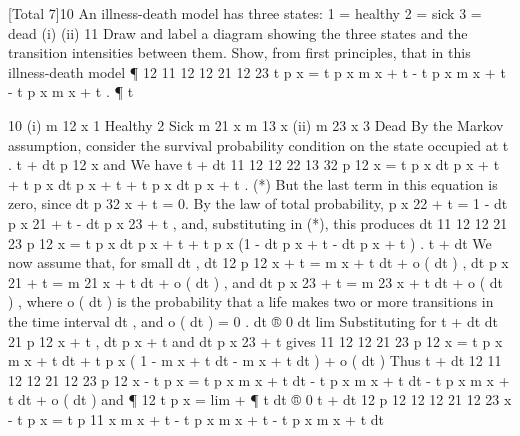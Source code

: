\documentclass[a4paper,12pt]{article}
\begin{document}
[Total 7]10
An illness-death model has three states:
1 = healthy
2 = sick
3 = dead
(i)
(ii)
11
Draw and label a diagram showing the three states and the transition
intensities between them.
Show, from first principles, that in this illness-death model
¶ 12
11 12
12 21
12 23
t p x = t p x m x + t - t p x m x + t - t p x m x + t .
¶ t

10
(i)
m 12
x
1 Healthy
2 Sick
m 21
x
m 13
x
(ii)
m 23
x
3 Dead
By the Markov assumption, consider the survival probability
condition on the state occupied at t .
t + dt
p 12
x and
We have
t + dt
11
12
12
22
13
32
p 12
x = t p x dt p x + t + t p x dt p x + t + t p x dt p x + t . (*)
But the last term in this equation is zero, since
dt
p 32
x + t = 0.
By the law of total probability,
p x 22 + t = 1 - dt p x 21 + t - dt p x 23 + t ,
and, substituting in (*), this produces
dt
11
12
12
21
23
p 12
x = t p x dt p x + t + t p x (1 - dt p x + t - dt p x + t ) .
t + dt
We now assume that, for small dt ,
dt 12
p 12
x + t = m x + t dt + o ( dt ) ,
dt p x 21 + t = m 21
x + t dt + o ( dt ) , and
dt p x 23 + t = m 23
x + t dt + o ( dt ) ,
where o ( dt ) is the probability that a life makes two or more transitions
in the time interval dt , and
o ( dt )
= 0 .
dt ® 0 dt
lim
Substituting for
t + dt
dt
21
p 12
x + t , dt p x + t and
dt
p x 23 + t gives
11 12
12
21
23
p 12
x = t p x m x + t dt + t p x ( 1 - m x + t dt - m x + t dt ) + o ( dt )
Thus
t + dt
12
11 12
12 21
12 23
p 12
x - t p x = t p x m x + t dt - t p x m x + t dt - t p x m x + t dt + o ( dt )
and
¶ 12
t p x = lim +
¶ t
dt ® 0
t + dt
12
p 12
12
12 21
12 23
x - t p x
= t p 11
x m x + t - t p x m x + t - t p x m x + t
dt
\end{document}
